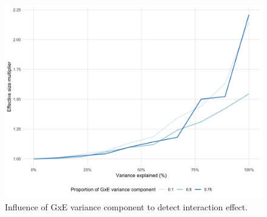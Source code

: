 \documentclass[]{book}
\begin{document}
\begin{figure}

{\centering \includegraphics[width=1\linewidth]{figures/04-figure-sup-power-interaction-prop} 

}

\caption{Influence of GxE variance component to
detect interaction effect.}\label{fig:power-interaction-prop}
\end{figure}






\backmatter
\end{document}
